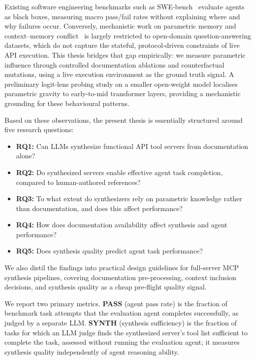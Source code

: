 Existing software engineering benchmarks such as SWE-bench~\citep{jimenez2023swebench} evaluate agents as black boxes, measuring macro pass/fail rates without explaining where and why failures occur. Conversely, mechanistic work on parametric memory and context--memory conflict~\citep{mallen2023knowns,longpre2021entity,juice2025} is largely restricted to open-domain question-answering datasets, which do not capture the stateful, protocol-driven constraints of live API execution. This thesis bridges that gap empirically: we measure parametric influence through controlled documentation ablations and counterfactual mutations, using a live execution environment as the ground truth signal. A preliminary logit-lens probing study on a smaller open-weight model localises parametric gravity to early-to-mid transformer layers, providing a mechanistic grounding for these behavioural patterns.

Based on these observations, the present thesis is essentially structured around five research questions:

\begin{itemize}
  \item \textbf{RQ1:} Can LLMs synthesize functional API tool servers from documentation alone?
  \item \textbf{RQ2:} Do synthesized servers enable effective agent task completion, compared to human-authored references?
  \item \textbf{RQ3:} To what extent do synthesizers rely on parametric knowledge rather than documentation, and does this affect performance?
  \item \textbf{RQ4:} How does documentation availability affect synthesis and agent performance?
  \item \textbf{RQ5:} Does synthesis quality predict agent task performance?
\end{itemize}

We also distil the findings into practical design guidelines for full-server MCP synthesis pipelines, covering documentation pre-processing, context inclusion decisions, and synthesis quality as a cheap pre-flight quality signal.

We report two primary metrics. \textbf{PASS} (agent pass rate) is the fraction of benchmark task attempts that the evaluation agent completes successfully, as judged by a separate LLM. \textbf{SYNTH} (synthesis sufficiency) is the fraction of tasks for which an LLM judge finds the synthesized server's tool list sufficient to complete the task, assessed without running the evaluation agent; it measures synthesis quality independently of agent reasoning ability.

